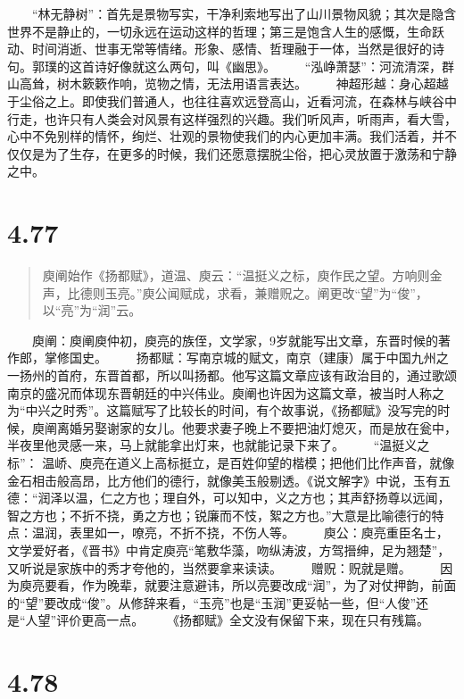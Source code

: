 \documentclass[]{book}
\begin{document}
　　``林无静树''：首先是景物写实，干净利索地写出了山川景物风貌；其次是隐含世界不是静止的，一切永远在运动这样的哲理；第三是饱含人生的感慨，生命跃动、时间消逝、世事无常等情绪。形象、感情、哲理融于一体，当然是很好的诗句。郭璞的这首诗好像就这么两句，叫《幽思》。
　　``泓峥萧瑟''：河流清深，群山高耸，树木簌簌作响，览物之情，无法用语言表达。
　　神超形越：身心超越于尘俗之上。即使我们普通人，也往往喜欢远登高山，近看河流，在森林与峡谷中行走，也许只有人类会对风景有这样强烈的兴趣。我们听风声，听雨声，看大雪，心中不免别样的情怀，绚烂、壮观的景物使我们的内心更加丰满。我们活着，并不仅仅是为了生存，在更多的时候，我们还愿意摆脱尘俗，把心灵放置于激荡和宁静之中。

\section{4.77}\label{section-254}

\begin{quote}
庾阐始作《扬都赋》，道温、庾云：``温挺义之标，庾作民之望。方响则金声，比德则玉亮。''庾公闻赋成，求看，兼赠贶之。阐更改``望''为``俊''，以``亮''为``润''云。
\end{quote}

　　庾阐：庾阐庾仲初，庾亮的族侄，文学家，9岁就能写出文章，东晋时候的著作郎，掌修国史。
　　扬都赋：写南京城的赋文，南京（建康）属于中国九州之一扬州的首府，东晋首都，所以叫扬都。他写这篇文章应该有政治目的，通过歌颂南京的盛况而体现东晋朝廷的中兴伟业。庾阐也许因为这篇文章，被当时人称之为``中兴之时秀''。这篇赋写了比较长的时间，有个故事说，《扬都赋》没写完的时候，庾阐离婚另娶谢家的女儿。他要求妻子晚上不要把油灯熄灭，而是放在瓮中，半夜里他灵感一来，马上就能拿出灯来，也就能记录下来了。
　　``温挺义之标''：
温峤、庾亮在道义上高标挺立，是百姓仰望的楷模；把他们比作声音，就像金石相击般高昂，比方他们的德行，就像美玉般剔透。《说文解字》中说，玉有五德：``润泽以温，仁之方也；理自外，可以知中，义之方也；其声舒扬尊以远闻，智之方也；不折不挠，勇之方也；锐廉而不忮，絮之方也。''大意是比喻德行的特点：温润，表里如一，嘹亮，不折不挠，不伤人等。
　　庾公：庾亮重臣名士，文学爱好者，《晋书》中肯定庾亮``笔敷华藻，吻纵涛波，方驾搢绅，足为翘楚''，又听说是家族中的秀才夸他的，当然要拿来读读。
　　赠贶：贶就是赠。
　　因为庾亮要看，作为晚辈，就要注意避讳，所以亮要改成``润''，为了对仗押韵，前面的``望''要改成``俊''。从修辞来看，``玉亮''也是``玉润''更妥帖一些，但``人俊''还是``人望''评价更高一点。
　　《扬都赋》全文没有保留下来，现在只有残篇。

\section{4.78}\label{section-255}
\end{document}
